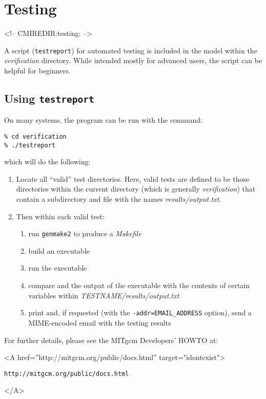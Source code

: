 
\section{Testing}
\label{sect:testing}
\label{www:testing}
\begin{rawhtml}
<!-- CMIREDIR:testing: -->
\end{rawhtml}

A script (\texttt{testreport}) for automated testing is included in
the model within the {\em verification} directory.  While intended
mostly for advanced users, the script can be helpful for beginners.

\subsection{Using \texttt{testreport}}

On many systems, the program can be run with the command:
\begin{verbatim}
% cd verification
% ./testreport
\end{verbatim}
which will do the following:
\begin{enumerate}
\item Locate all ``valid'' test directories.  Here, valid tests are
  defined to be those directories within the current directory (which
  is generally {\em verification}) that contain a subdirectory and
  file with the names {\em results/output.txt}.

\item Then within each valid test:
  \begin{enumerate}
  \item run \texttt{genmake2} to produce a {\em Makefile}
  \item build an executable
  \item run the executable
  \item compare and the output of the executable with the
    contents of certain variables within {\em
      TESTNAME/results/output.txt}
  \item print and, if requested (with the
    \texttt{-addr=EMAIL\_ADDRESS} option), send a MIME-encoded email
    with the testing results
  \end{enumerate}

\end{enumerate}

For further details, please see the MITgcm Developers' HOWTO at:
\begin{rawhtml} <A href=''http://mitgcm.org/public/docs.html'' target="idontexist"> \end{rawhtml}
\begin{verbatim}
http://mitgcm.org/public/docs.html
\end{verbatim}
\begin{rawhtml} </A> \end{rawhtml}


